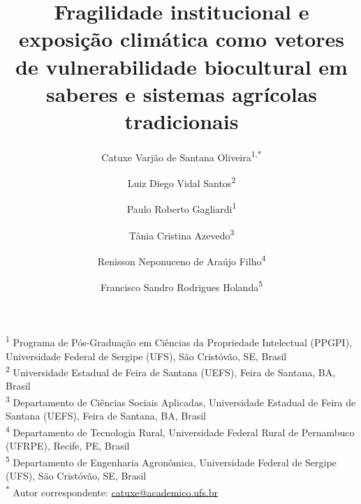 \documentclass[12pt,a4paper]{article}
\begin{document}
\title{Fragilidade institucional e exposi\c{c}\~ao clim\'atica como vetores de vulnerabilidade biocultural em saberes e sistemas agr\'icolas tradicionais}

\author{Catuxe Varjão de Santana Oliveira\textsuperscript{1,*} \and Luiz Diego Vidal Santos\textsuperscript{2} \and Paulo Roberto Gagliardi\textsuperscript{1} \and Tânia Cristina Azevedo\textsuperscript{3} \and Renisson Neponuceno de Araújo Filho\textsuperscript{4} \and Francisco Sandro Rodrigues Holanda\textsuperscript{5}}

\date{}
\maketitle

\noindent\textsuperscript{1} Programa de Pós-Graduação em Ciências da Propriedade Intelectual (PPGPI), Universidade Federal de Sergipe (UFS), São Cristóvão, SE, Brasil \\
\textsuperscript{2} Universidade Estadual de Feira de Santana (UEFS), Feira de Santana, BA, Brasil \\
\textsuperscript{3} Departamento de Ciências Sociais Aplicadas, Universidade Estadual de Feira de Santana (UEFS), Feira de Santana, BA, Brasil \\
\textsuperscript{4} Departamento de Tecnologia Rural, Universidade Federal Rural de Pernambuco (UFRPE), Recife, PE, Brasil \\
\textsuperscript{5} Departamento de Engenharia Agronômica, Universidade Federal de Sergipe (UFS), São Cristóvão, SE, Brasil \\
\textsuperscript{*} Autor correspondente: \href{mailto:catuxe@academico.ufs.br}{catuxe@academico.ufs.br}
\end{document}
